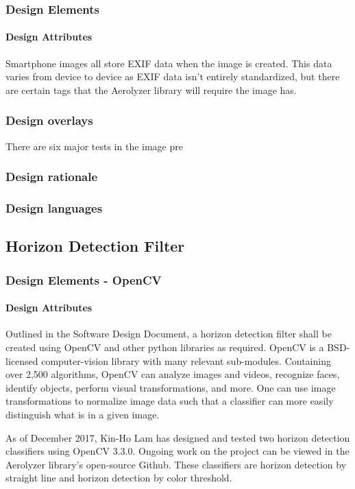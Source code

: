 \documentclass[onecolumn, draftclsnofoot,10pt, compsoc]{IEEEtran}
\begin{document}
\begin{singlespace}
      \subsubsection{Design Elements}
          \paragraph{Design Attributes}
          Smartphone images all store EXIF data when the image is created. This data varies from device to device as EXIF data isn't entirely standardized, but there are certain tags that the Aerolyzer library will require the image has.
      \subsubsection{Design overlays}
		There are six major tests in the image pre
      \subsubsection{Design rationale}
		
     
      \subsubsection{Design languages}
		
	\subsection{Horizon Detection Filter}
      \subsubsection{Design Elements - OpenCV }
      		\paragraph{Design Attributes}
          		Outlined in the Software Design Document, a horizon detection filter shall be created using OpenCV and other python libraries as required. OpenCV is a BSD-licensed computer-vision library with many relevant sub-modules. Containing over 2,500 algorithms, OpenCV can analyze images and videos, recognize faces, identify objects, perform visual transformations, and more. One can use image transformations to normalize image data such that a classifier can more easily distinguish what is in a given image. \cite{svm}

				As of December 2017, Kin-Ho Lam has designed and tested two horizon detection classifiers using OpenCV 3.3.0. Ongoing work on the project can be viewed in the Aerolyzer library’s open-source Github. These classifiers are horizon detection by straight line and horizon detection by color threshold.


\end{singlespace}
\end{document}
